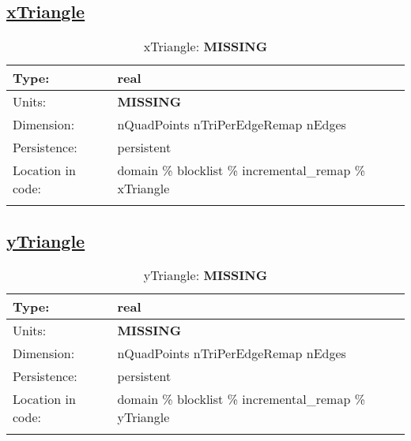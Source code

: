 \subsection[xTriangle]{\hyperref[sec:var_tab_incremental_remap]{xTriangle}}
\label{subsec:var_sec_incremental_remap_xTriangle}
\begin{center}
\begin{longtable}{| p{2.0in} | p{4.0in} |}
        \hline 
        Type: & real \\
        \hline 
        Units: & {\bf \color{red} MISSING} \\
        \hline 
        Dimension: & nQuadPoints nTriPerEdgeRemap nEdges \\
        \hline 
        Persistence: & persistent \\
        \hline 
         Location in code: & domain \% blocklist \% incremental\_remap \% xTriangle \\
         \hline 
    \caption{xTriangle: {\bf \color{red} MISSING}}
\end{longtable}
\end{center}
\subsection[yTriangle]{\hyperref[sec:var_tab_incremental_remap]{yTriangle}}
\label{subsec:var_sec_incremental_remap_yTriangle}
\begin{center}
\begin{longtable}{| p{2.0in} | p{4.0in} |}
        \hline 
        Type: & real \\
        \hline 
        Units: & {\bf \color{red} MISSING} \\
        \hline 
        Dimension: & nQuadPoints nTriPerEdgeRemap nEdges \\
        \hline 
        Persistence: & persistent \\
        \hline 
         Location in code: & domain \% blocklist \% incremental\_remap \% yTriangle \\
         \hline 
    \caption{yTriangle: {\bf \color{red} MISSING}}
\end{longtable}
\end{center}
